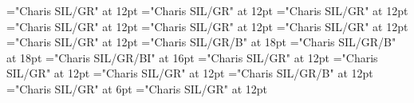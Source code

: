 \documentclass[a4paper,twoside]{article}
\begin{document}
\pagestyle{plain}
\sloppy
\setlength{\parfillskip}{0pt plus 1fil}
\font\divzxx="Charis SIL/GR" at 12pt
\font\spanzxx="Charis SIL/GR" at 12pt
\font\picturepictureRight="Charis SIL/GR" at 12pt
\font\imgpicturedivpictureLeft="Charis SIL/GR" at 12pt
\font\scrBookscrBody="Charis SIL/GR" at 12pt
\font\scrBookNamezxxscrBookscrBody="Charis SIL/GR" at 12pt
\font\scrBookCodezxxscrBookscrBody="Charis SIL/GR" at 12pt
\font\TitleMainscrBookscrBody="Charis SIL/GR/B" at 18pt
\font\spanzxxTitleMainscrBookscrBody="Charis SIL/GR/B" at 18pt
\font\TitleSecondaryzxxTitleMainscrBookscrBody="Charis SIL/GR/BI" at 16pt
\font\columnsscrBookscrBody="Charis SIL/GR" at 12pt
\font\scrSectioncolumnsscrBookscrBody="Charis SIL/GR" at 12pt
\font\ParagraphscrSectioncolumnsscrBookscrBody="Charis SIL/GR" at 12pt
\font\ChapterNumberzxxParagraphscrSectioncolumnsscrBookscrBody="Charis SIL/GR/B" at 12pt
\font\VerseNumberzxxParagraphscrSectioncolumnsscrBookscrBody="Charis SIL/GR" at 6pt
\font\spanzxxParagraphscrSectioncolumnsscrBookscrBody="Charis SIL/GR" at 12pt

\mbox{} 
\newpage 
\newpage 
\setcounter{page}{1} 
\pagestyle{fancy} 
\begin{comment}

\scrBookNamezxxscrBookscrBody{
 \label{PageStock_ChapterNumber1} Buka Tango}\end{comment}
 
\end{document}
